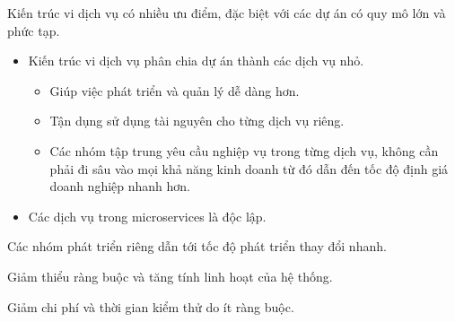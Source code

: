 Kiến trúc vi dịch vụ có nhiều ưu điểm, đặc biệt với các dự án có quy mô lớn và phức tạp.

\begin{itemize}

    \item Kiến trúc vi dịch vụ phân chia dự án thành các dịch vụ nhỏ.

          \begin{itemize}


              \item Giúp việc phát triển và quản lý dễ dàng hơn.

              \item Tận dụng sử dụng tài nguyên cho từng dịch vụ riêng.


              \item Các nhóm tập trung yêu cầu nghiệp vụ trong từng dịch vụ, không cần phải đi sâu vào mọi khả năng kinh doanh từ đó dẫn đến tốc độ định giá doanh nghiệp nhanh hơn.

          \end{itemize}

    \item       Các dịch vụ trong microservices   là độc lập.
\end{itemize}











Các nhóm phát triển riêng dẫn tới tốc độ phát triển thay đổi nhanh.

Giảm thiểu ràng buộc và tăng tính linh hoạt của hệ thống.

Giảm chi phí và thời gian kiểm thử do ít ràng buộc.


